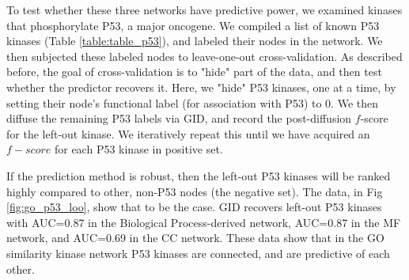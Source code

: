 \documentclass[12pt,a4paper]{report}
\begin{document}
{{%
To test whether these three networks have predictive power, we examined kinases that phosphorylate P53, a major oncogene. We compiled a list of known P53 kinases (Table \ref{table:table_p53}), and labeled their nodes in the network. We then subjected these labeled nodes to leave-one-out cross-validation. As described before, the goal of cross-validation is to "hide" part of the data, and then test whether the predictor recovers it. Here, we "hide" P53 kinases, one at a time, by setting their node's functional label (for association with P53) to 0. We then diffuse the remaining P53 labels via GID, and record the post-diffusion $f$-score for the left-out kinase. We iteratively repeat this until we have acquired an $f-score$ for each P53 kinase in positive set.

If the prediction method is robust, then the left-out P53 kinases will be ranked highly compared to other, non-P53 nodes (the negative set). The data, in Fig \ref{fig:go_p53_loo}, show that to be the case. GID recovers left-out P53 kinases with AUC=0.87 in the Biological Process-derived network, AUC=0.87 in the MF network, and AUC=0.69 in the CC network. These data show that in the GO similarity kinase network P53 kinases are connected, and are predictive of each other.


}}
\end{document}
